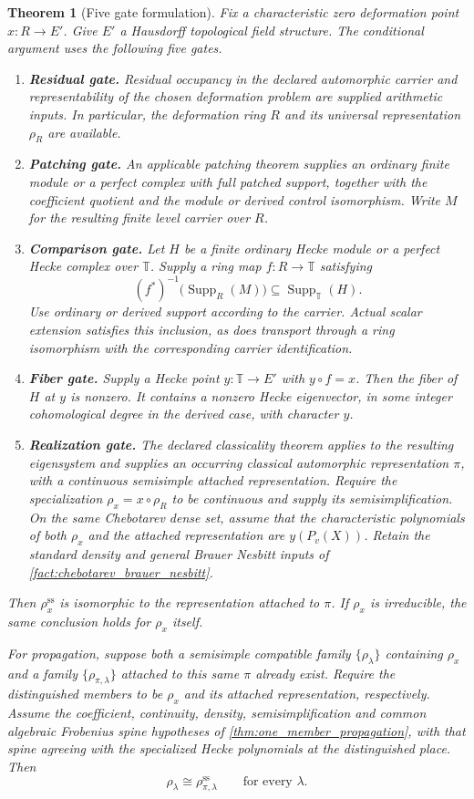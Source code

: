 \documentclass[11pt]{amsart}
\newtheorem{theorem}{Theorem}[section]
\theoremstyle{definition}
\theoremstyle{remark}
\newcommand{\TT}{\mathbb T}
\newcommand{\Supp}{\operatorname{Supp}}
\begin{document}
\begin{theorem}[Five gate formulation]\label{thm:five_gate_completion}
Fix a characteristic zero deformation point \(x:R\to E'\). Give \(E'\) a Hausdorff topological field structure. The conditional argument uses the following five gates.
\begin{enumerate}
\item \textbf{Residual gate.} Residual occupancy in the declared automorphic carrier and representability of the chosen deformation problem are supplied arithmetic inputs. In particular, the deformation ring \(R\) and its universal representation \(\rho_R\) are available.
\item \textbf{Patching gate.} An applicable patching theorem supplies an ordinary finite module or a perfect complex with full patched support, together with the coefficient quotient and the module or derived control isomorphism. Write \(M\) for the resulting finite level carrier over \(R\).
\item \textbf{Comparison gate.} Let \(H\) be a finite ordinary Hecke module or a perfect Hecke complex over \(\TT\). Supply a ring map \(f:R\to\TT\) satisfying
\[
(f^*)^{-1}\bigl(\Supp_R(M)\bigr)\subseteq\Supp_{\TT}(H).
\]
Use ordinary or derived support according to the carrier. Actual scalar extension satisfies this inclusion, as does transport through a ring isomorphism with the corresponding carrier identification.
\item \textbf{Fiber gate.} Supply a Hecke point \(y:\TT\to E'\) with \(y\circ f=x\). Then the fiber of \(H\) at \(y\) is nonzero. It contains a nonzero Hecke eigenvector, in some integer cohomological degree in the derived case, with character \(y\).
\item \textbf{Realization gate.} The declared classicality theorem applies to the resulting eigensystem and supplies an occurring classical automorphic representation \(\pi\), with a continuous semisimple attached representation. Require the specialization \(\rho_x=x\circ\rho_R\) to be continuous and supply its semisimplification. On the same Chebotarev dense set, assume that the characteristic polynomials of both \(\rho_x\) and the attached representation are \(y(P_v(X))\). Retain the standard density and general Brauer Nesbitt inputs of \cref{fact:chebotarev_brauer_nesbitt}.
\end{enumerate}
Then \(\rho_x^{\mathrm{ss}}\) is isomorphic to the representation attached to \(\pi\). If \(\rho_x\) is irreducible, the same conclusion holds for \(\rho_x\) itself.

For propagation, suppose both a semisimple compatible family \(\{\rho_\lambda\}\) containing \(\rho_x\) and a family \(\{\rho_{\pi,\lambda}\}\) attached to this same \(\pi\) already exist. Require the distinguished members to be \(\rho_x\) and its attached representation, respectively. Assume the coefficient, continuity, density, semisimplification and common algebraic Frobenius spine hypotheses of \cref{thm:one_member_propagation}, with that spine agreeing with the specialized Hecke polynomials at the distinguished place. Then
\[
\rho_\lambda\cong\rho_{\pi,\lambda}^{\mathrm{ss}}
\qquad\text{for every }\lambda.
\]
\end{theorem}
\end{document}
